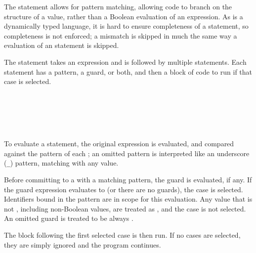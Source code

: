 The  statement allows for pattern matching, allowing code to branch
on the structure of a value, rather than a Boolean evaluation of an expression.
As \Trilogy{} is a dynamically typed language, it is hard to ensure completeness
of a  statement, so completeness is not enforced; a mismatch is skipped
in much the same way a  evaluation of an  statement is skipped.

The  statement takes an expression and is followed by multiple 
statements. Each  statement has a pattern, a guard, or both, and then a block
of code to run if that case is selected.

\begin{bnf*}
     \\
     \\
     \\
     \\
\end{bnf*}

To evaluate a  statement, the original expression is evaluated, and compared
against the pattern of each ; an omitted pattern is interpreted like an underscore
(\texttt{\_}) pattern, matching with any value.

Before committing to a  with a matching pattern, the guard is evaluated, if any.
If the guard expression evaluates to  (or there are no guards), the case is selected.
Identifiers bound in the pattern are in scope for this evaluation. Any value that is not ,
including non-Boolean values, are treated as , and the case is not selected. An omitted
guard is treated to be always .

The block following the first selected case is then run. If no cases are selected,
they are simply ignored and the program continues.

